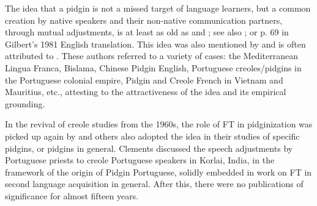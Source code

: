 \documentclass[output=paper,colorlinks,citecolor=brown]{langscibook}
\begin{document}
The idea that a pidgin is not a missed target of language learners, but a common creation by native speakers and their non-native communication partners, through mutual adjustments, is at least as old as \citet[67]{Coelho1881} and \citet[7ff]{Schuchardt1888}; see also \citet[443]{Schuchardt1909}; or p. 69 in Gilbert’s 1981 English translation. This idea was also mentioned by \citet[216]{Jespersen1922} and is often attributed to \citet[472]{Bloomfield1933}. These authors referred to a variety of cases: the Mediterranean Lingua Franca, Bislama, Chinese Pidgin English, Portuguese creoles/pidgins in the Portuguese colonial empire, Pidgin and Creole French in Vietnam and Mauritius, etc., attesting to the attractiveness of the idea and its empirical grounding.

In the revival of creole studies from the 1960s, the role of FT in pidginization was picked up again by \citet{Naro1978} and others also adopted the idea in their studies of specific pidgins, or pidgins in general. Clements \citeyearpar{Clements1992} discussed the speech adjustments by Portuguese priests to creole Portuguese speakers in Korlai, India, in the framework of the origin of Pidgin Portuguese, solidly embedded in work on FT in second language acquisition in general. After this, there were no publications of significance for almost fifteen years.
\end{document}
